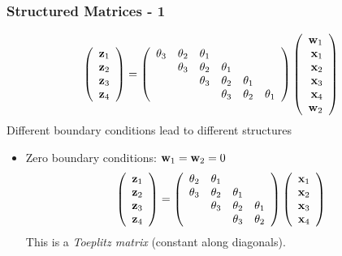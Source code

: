 \documentclass[12pt,fleqn,handout]{beamer}
\begin{document}
\begin{frame}
	\frametitle{Structured Matrices - 1}
	$$
		\left( 
		\begin{array}{r}
			{\bf z}_1\\
			{\bf z}_2\\
			{\bf z}_3\\
			{\bf z}_4
		\end{array}
		\right)
		=
		\left( 
		\begin{array}{rrrrrrr}
			\theta_3 & \theta_2 & \theta_1 &          &          &           \\
			         & \theta_3 & \theta_2 & \theta_1 &          &           \\
			         &          & \theta_3 & \theta_2 & \theta_1 &           \\
			         &          &          & \theta_3 & \theta_2 & \theta_1 \\
		\end{array}
		\right)
		\left( 
		\begin{array}{r}
			{\bf w}_1\\
			{\bf x}_1\\
			{\bf x}_2\\
			{\bf x}_3\\
			{\bf x}_4\\
			{\bf w}_2
		\end{array}
		\right)
	$$
	Different boundary conditions lead to different structures
	\pause
	\begin{itemize}
		\item Zero boundary conditions: ${\bf w}_1 = {\bf w}_2 = 0$
	$$
		\left( 
		\begin{array}{r}
			{\bf z}_1\\
			{\bf z}_2\\
			{\bf z}_3\\
			{\bf z}_4
		\end{array}
		\right)
		=
		\left( 
		\begin{array}{rrrrr}
			\theta_2 & \theta_1 &          &           \\
			\theta_3 & \theta_2 & \theta_1 &           \\
			         & \theta_3 & \theta_2 & \theta_1  \\
			         &          & \theta_3 & \theta_2 \\
		\end{array}
		\right)
		\left( 
		\begin{array}{r}
			{\bf x}_1\\
			{\bf x}_2\\
			{\bf x}_3\\
			{\bf x}_4\\
		\end{array}
		\right)
	$$		
	This is a \emph{Toeplitz matrix} (constant along diagonals).
	\end{itemize}
\end{frame}
\end{document}
